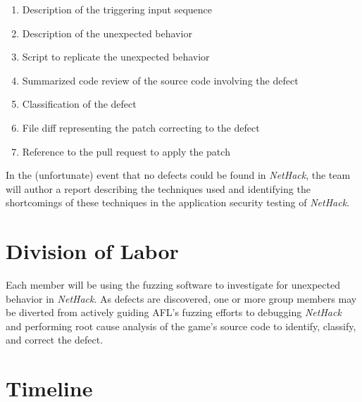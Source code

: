\documentclass[12pt]{diazessay}
\begin{document}
\begin{enumerate}

  \item Description of the triggering input sequence
  \item Description of the unexpected behavior
  \item Script to replicate the unexpected behavior
  \item Summarized code review of the source code involving the defect
  \item Classification of the defect
  \item File diff representing the patch correcting to the defect
  \item Reference to the pull request to apply the patch

\end{enumerate}

In the (unfortunate) event that no defects could be found in \emph{NetHack}, the team will author a report describing the techniques used and identifying the shortcomings of these techniques in the application security testing of \emph{NetHack}.


\section*{Division of Labor}

Each member will be using the fuzzing software to investigate for unexpected behavior in \emph{NetHack}. As defects are discovered, one or more group members may be diverted from actively guiding AFL's fuzzing efforts to debugging \emph{NetHack} and performing root cause analysis of the game's source code to identify, classify, and correct the defect.


\section*{Timeline}
\end{document}
